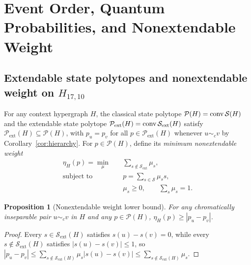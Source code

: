 \documentclass[aps,pra,reprint,superscriptaddress,longbibliography,nofootinbib,floatfix,10pt]{revtex4-2}
\newtheorem{proposition}[theorem]{Proposition}
\theoremstyle{definition}\newtheorem{definition}[theorem]{Definition}
\theoremstyle{remark}\newtheorem{remark}[theorem]{Remark}
\newcommand{\Sc}{\mathcal S}\newcommand{\Cc}{\mathcal C}
\begin{document}
\section{Event Order, Quantum Probabilities, and Nonextendable Weight}\label{sec:probabilities}

\subsection{Extendable state polytopes and nonextendable weight on \texorpdfstring{$H_{17,10}$}{H17,10}}

For any context hypergraph $H$, the classical state polytope $\mathcal P(H)=\conv\Sc(H)$ and the extendable state polytope $\mathcal P_{\mathrm{ext}}(H)=\conv\Sc_{\mathrm{ext}}(H)$ satisfy $\mathcal P_{\mathrm{ext}}(H)\subseteq\mathcal P(H)$, with $p_u=p_v$ for all $p\in\mathcal P_{\mathrm{ext}}(H)$ whenever $u\sim_c v$ by Corollary~\ref{cor:hierarchy}. For $p\in\mathcal P(H)$, define its \emph{minimum nonextendable weight}
\begin{equation}\label{eq:weight}
\begin{aligned}
\eta_H(p)=\min_{\mu}\quad&\sum_{s\notin\mathcal S_{\mathrm{ext}}}\mu_s,\\
\text{subject to}\quad&p=\sum_{s\in\mathcal S}\mu_s s,\\
&\mu_s\ge0,\qquad\sum_s\mu_s=1.
\end{aligned}
\end{equation}

\begin{proposition}[Nonextendable weight lower bound]\label{prop:weight}
For any chromatically inseparable pair $u\sim_c v$ in $H$ and any $p\in\mathcal P(H)$, $\eta_H(p)\ge |p_u-p_v|$.
\end{proposition}
\begin{proof}
Every $s\in\Sc_{\mathrm{ext}}(H)$ satisfies $s(u)-s(v)=0$, while every $s\notin\Sc_{\mathrm{ext}}(H)$ satisfies $|s(u)-s(v)|\le1$, so $|p_u-p_v|\le\sum_{s\notin\Sc_{\mathrm{ext}}(H)}\mu_s|s(u)-s(v)|\le\sum_{s\notin\Sc_{\mathrm{ext}}(H)}\mu_s$.
\end{proof}
\end{document}
